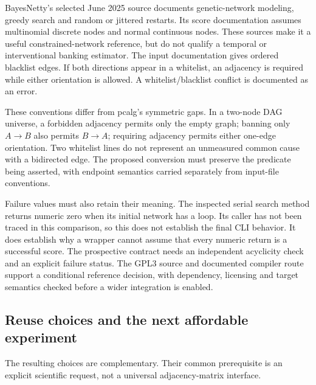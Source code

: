 BayesNetty's selected June 2025 source documents genetic-network modeling,
greedy search and random or jittered restarts. Its score documentation assumes
multinomial discrete nodes and normal continuous nodes. These sources make it
a useful constrained-network reference, but do not qualify a temporal or
interventional banking estimator. The input documentation gives ordered
blacklist edges. If both directions appear in a whitelist, an adjacency is
required while either orientation is allowed. A whitelist/blacklist conflict
is documented as an error. \citep{exec16_ct_bayesnetty}

These conventions differ from pcalg's symmetric gaps. In a two-node DAG
universe, a forbidden adjacency permits only the empty graph; banning only
$A\to B$ also permits $B\to A$; requiring adjacency permits either one-edge
orientation. Two whitelist lines do not represent an unmeasured common cause
with a bidirected edge. The proposed conversion must preserve the predicate
being asserted, with endpoint semantics carried separately from input-file
conventions. \citep{exec16_ct_bayesnetty,exec16_ct_pcalg,exec16_ct_oracle}

Failure values must also retain their meaning. The inspected serial search
method returns numeric zero when its initial network has a loop. Its caller
has not been traced in this comparison, so this does not establish the final
CLI behavior. It does establish why a wrapper cannot assume that every numeric
return is a successful score. The prospective contract needs an independent
acyclicity check and an explicit failure status. The GPL3 source and documented
compiler route support a conditional reference decision, with dependency,
licensing and target semantics checked before a wider integration is enabled.
\citep{exec16_ct_bayesnetty,exec16_ct_design}

\subsection{Reuse choices and the next affordable experiment}

The resulting choices are complementary. Their common prerequisite is an
explicit scientific request, not a universal adjacency-matrix interface.

